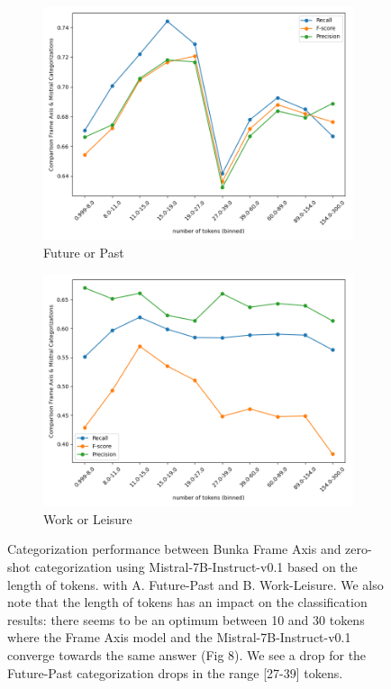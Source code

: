 \documentclass{article}
\begin{document}
\begin{figure}
 \begin{subfigure}{0.49\textwidth}
     \centering
     \includegraphics[width=\linewidth]{img/classification_comparison/tokens_future_past.png}
     \caption{Future or Past}
     \label{fig:a}
 \end{subfigure}
 \hfill
 \begin{subfigure}{0.49\textwidth}
     \centering
      \includegraphics[width=\linewidth]{img/classification_comparison/tokens_work_leisure.png}
     \caption{Work or Leisure}
     \label{fig:b}
 \end{subfigure}
 \caption{Categorization performance between Bunka Frame Axis and zero-shot categorization using Mistral-7B-Instruct-v0.1  based on the length of tokens. with A. Future-Past and B. Work-Leisure. We also note that the length of tokens has an impact on the classification results: there seems to be an optimum between 10 and 30 tokens where the Frame Axis model and the Mistral-7B-Instruct-v0.1 converge towards the same answer (Fig 8). We see a drop for the Future-Past categorization drops in the range [27-39] tokens. 
}
\end{figure}
\end{document}
